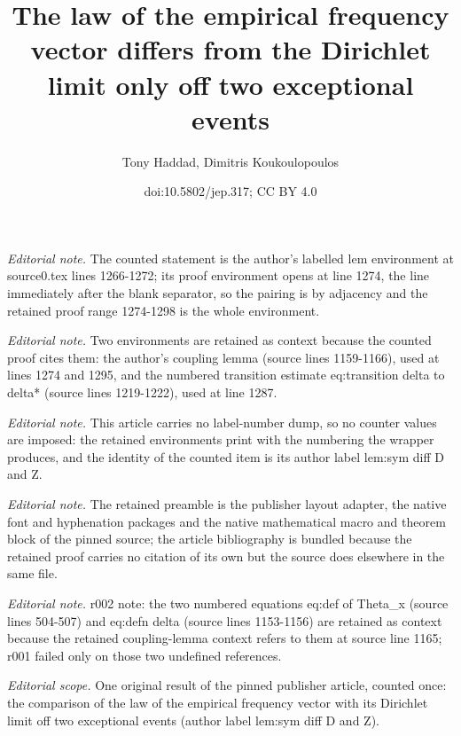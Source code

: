\documentclass[10pt,a4paper]{article}
\title{The law of the empirical frequency vector differs from the Dirichlet limit only off two exceptional events}
\author{Tony Haddad, Dimitris Koukoulopoulos}
\date{doi:10.5802/jep.317; CC BY 4.0}
\theoremstyle{plain}
\theoremstyle{definition}
\begin{document}
\maketitle
\noindent\textit{Editorial note.} The counted statement is the author's labelled lem environment at source0.tex lines 1266-1272; its proof environment opens at line 1274, the line immediately after the blank separator, so the pairing is by adjacency and the retained proof range 1274-1298 is the whole environment.\par\medskip
\noindent\textit{Editorial note.} Two environments are retained as context because the counted proof cites them: the author's coupling lemma (source lines 1159-1166), used at lines 1274 and 1295, and the numbered transition estimate eq:transition delta to delta* (source lines 1219-1222), used at line 1287.\par\medskip
\noindent\textit{Editorial note.} This article carries no label-number dump, so no counter values are imposed: the retained environments print with the numbering the wrapper produces, and the identity of the counted item is its author label lem:sym diff D and Z.\par\medskip
\noindent\textit{Editorial note.} The retained preamble is the publisher layout adapter, the native font and hyphenation packages and the native mathematical macro and theorem block of the pinned source; the article bibliography is bundled because the retained proof carries no citation of its own but the source does elsewhere in the same file.\par\medskip
\noindent\textit{Editorial note.} r002 note: the two numbered equations eq:def of Theta\_x (source lines 504-507) and eq:defn delta (source lines 1153-1156) are retained as context because the retained coupling-lemma context refers to them at source line 1165; r001 failed only on those two undefined references.\par\medskip
\noindent\textit{Editorial scope.} One original result of the pinned publisher article, counted once: the comparison of the law of the empirical frequency vector with its Dirichlet limit off two exceptional events (author label lem:sym diff D and Z).\par\medskip
\end{document}
